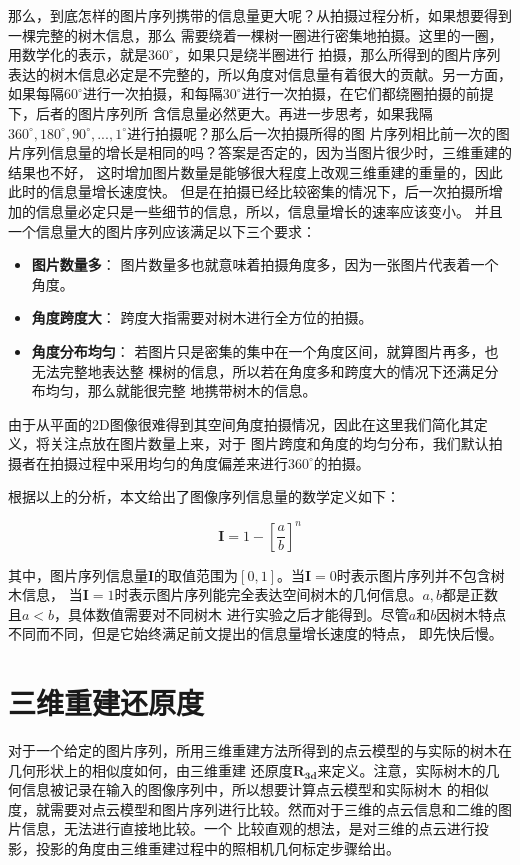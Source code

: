 那么，到底怎样的图片序列携带的信息量更大呢？从拍摄过程分析，如果想要得到一棵完整的树木信息，那么
需要绕着一棵树一圈进行密集地拍摄。这里的一圈，用数学化的表示，就是$360^\circ$，如果只是绕半圈进行
拍摄，那么所得到的图片序列表达的树木信息必定是不完整的，所以角度对信息量有着很大的贡献。另一方面，
如果每隔$60^\circ$进行一次拍摄，和每隔$30^\circ$进行一次拍摄，在它们都绕圈拍摄的前提下，后者的图片序列所
含信息量必然更大。再进一步思考，如果我隔$360^\circ,180^\circ,90^\circ,..., 1^\circ$进行拍摄呢？那么后一次拍摄所得的图
片序列相比前一次的图片序列信息量的增长是相同的吗？答案是否定的，因为当图片很少时，三维重建的结果也不好，
这时增加图片数量是能够很大程度上改观三维重建的重量的，因此此时的信息量增长速度快。
但是在拍摄已经比较密集的情况下，后一次拍摄所增加的信息量必定只是一些细节的信息，所以，信息量增长的速率应该变小。
并且一个信息量大的图片序列应该满足以下三个要求：\\
\begin{itemize}
	\item \textbf{图片数量多}： 图片数量多也就意味着拍摄角度多，因为一张图片代表着一个角度。
	\item \textbf{角度跨度大}： 跨度大指需要对树木进行全方位的拍摄。
	\item \textbf{角度分布均匀}： 若图片只是密集的集中在一个角度区间，就算图片再多，也无法完整地表达整
								  棵树的信息，所以若在角度多和跨度大的情况下还满足分布均匀，那么就能很完整
								  地携带树木的信息。
\end{itemize}

由于从平面的2D图像很难得到其空间角度拍摄情况，因此在这里我们简化其定义，将关注点放在图片数量上来，对于
图片跨度和角度的均匀分布，我们默认拍摄者在拍摄过程中采用均匀的角度偏差来进行$360^\circ$的拍摄。

根据以上的分析，本文给出了图像序列信息量的数学定义如下：\\
\begin{definition}
	\[ \mathbf{I}=1-[\frac{a}{b}]^n \]
\end{definition}

其中，图片序列信息量$\mathbf{I}$的取值范围为$[0,1]$。当$\mathbf{I}=0$时表示图片序列并不包含树木信息，
当$\mathbf{I}=1$时表示图片序列能完全表达空间树木的几何信息。$a,b$都是正数且$a<b$，具体数值需要对不同树木
进行实验之后才能得到。尽管$a$和$b$因树木特点不同而不同，但是它始终满足前文提出的信息量增长速度的特点，
即先快后慢。

\section{三维重建还原度}
对于一个给定的图片序列，所用三维重建方法所得到的点云模型的与实际的树木在几何形状上的相似度如何，由三维重建
还原度$\mathbf{R_{3d}}$来定义。注意，实际树木的几何信息被记录在输入的图像序列中，所以想要计算点云模型和实际树木
的相似度，就需要对点云模型和图片序列进行比较。然而对于三维的点云信息和二维的图片信息，无法进行直接地比较。一个
比较直观的想法，是对三维的点云进行投影，投影的角度由三维重建过程中的照相机几何标定步骤给出。

